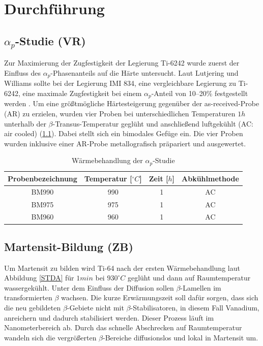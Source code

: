 \chapter{Durchführung}

\section{$\alpha_p$-Studie (VR)}
Zur Maximierung der Zugfestigkeit der Legierung Ti-6242 wurde zuerst der Einfluss des $\alpha_p$-Phasenanteils auf die Härte untersucht. Laut Lutjering und Williams sollte bei der Legierung IMI 834, eine vergleichbare Legierung zu Ti-6242, eine maximale Zugfestigkeit bei einem $\alpha_p$-Anteil von 10--20\% festgestellt werden \cite{Lutjering.2007}. Um eine größtmögliche Härtesteigerung gegenüber der as-received-Probe (AR) zu erzielen, wurden vier Proben bei unterschiedlichen Temperaturen $1h$ unterhalb der $\beta$-Transus-Temperatur geglüht und anschließend luftgekühlt (AC: air cooled) (\ref{tab:alphap}). Dabei stellt sich ein bimodales Gefüge ein. Die vier Proben wurden inklusive einer AR-Probe metallografisch präpariert und ausgewertet.

\begin{table}
	\centering
	\begin{tabular}{|c|c|c|c|}
	\hline 
	Probenbezeichnung & Temperatur [$^\circ C$] & Zeit [$h$] & Abkühlmethode \\ 
	\hline 
	BM990 & 990 & 1 & AC\\ 
	\hline 
	
	BM975 & 975 & 1 & AC\\ 
	\hline 
	BM960 & 960 & 1 & AC\\ 
	\hline 
	\end{tabular} 
	\caption{Wärmebehandlung der $\alpha_p$-Studie}
	\label{tab:alphap}
\end{table}

\pagebreak

\section{Martensit-Bildung (ZB)}

Um Martensit zu bilden wird Ti-64 nach der ersten Wärmebehandlung laut Abbildung \ref{STDA} für $1 min$  bei $930^\circ C$ geglüht und dann auf Raumtemperatur wassergekühlt. Unter dem Einfluss der Diffusion sollen $\beta$-Lamellen im transformierten $\beta$ wachsen. Die kurze Erwärmungszeit soll dafür sorgen, dass sich die neu gebildeten $\beta$-Gebiete nicht mit $\beta$-Stabilisatoren, in diesem Fall Vanadium, anreichern und dadurch stabilisiert werden. Dieser Prozess läuft im Nanometerbereich ab. Durch das schnelle Abschrecken auf Raumtemperatur wandeln sich die vergrößerten $\beta$-Bereiche diffusionslos und lokal in Martensit um.

